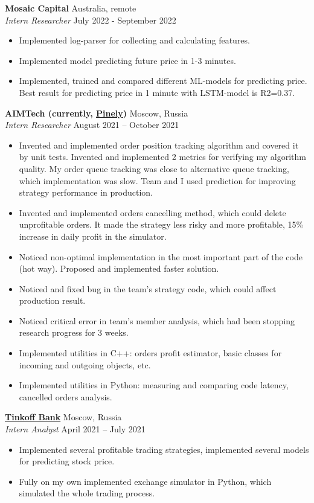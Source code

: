 \noindent
\textbf{Mosaic Capital} \hfill Australia, remote\\ %
\textit{Intern Researcher} \hfill July 2022 - September 2022 %
\begin{itemize}
\item Implemented log-parser for collecting and calculating features.
\item Implemented model predicting future price in 1-3 minutes.
\item Implemented, trained and compared different ML-models for predicting price. Best result for predicting price in 1 minute with LSTM-model is R2=0.37.
\end{itemize}

\noindent
\textbf{AIMTech (currently, \href{https://pinely.com}{Pinely})} \hfill Moscow, Russia\\ 
\textit{Intern Researcher} \hfill August 2021 -- October 2021 %
\begin{itemize}
\item Invented and implemented order position tracking algorithm and covered it by unit tests. Invented and implemented 2 metrics for verifying my algorithm quality. My order queue tracking was close to alternative queue tracking, which implementation was slow. Team  and I used prediction for improving strategy performance in production.
\item Invented and implemented orders cancelling method, which could delete unprofitable orders. It made the strategy less risky and more profitable, 15\% increase in daily profit in the simulator.
\item Noticed non-optimal implementation in the most important part of the code (hot way). Proposed and implemented faster solution.
\item Noticed and fixed bug in the team's strategy code, which could affect production result.
\item Noticed critical error in team's member analysis, which had been stopping research progress for 3 weeks. 
\item Implemented utilities in C++: orders profit estimator, basic classes for incoming and outgoing objects, etc.
\item Implemented utilities in Python: measuring and comparing code latency, cancelled orders analysis.
\end{itemize}

\noindent
\textbf{\href{https://www.tinkoff.ru}{Tinkoff Bank}} \hfill Moscow, Russia \\ 
\textit{Intern Analyst} \hfill April 2021 -- July 2021
\begin{itemize}
\item Implemented several profitable trading strategies, implemented several models for predicting stock price.
\item Fully on my own implemented exchange simulator in Python, which simulated the whole trading process.
\end{itemize} 

